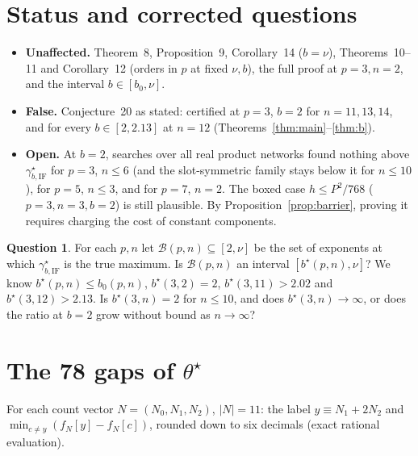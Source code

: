 \documentclass[11pt]{article}
\theoremstyle{definition}
\newtheorem{question}[theorem]{Question}
\newcommand{\gIF}{\gamma^{\star}_{b,\mathrm{IF}}}
\begin{document}
\section{Status and corrected questions}

\begin{itemize}
\item \textbf{Unaffected.} Theorem~8, Proposition~9, Corollary~14 ($b=\nu$), Theorems~10--11 and Corollary~12
(orders in $p$ at fixed $\nu,b$), the full proof at $p=3,n=2$, and the interval $b\in[b_0,\nu]$.
\item \textbf{False.} Conjecture~20 as stated: certified at $p=3$, $b=2$ for $n=11,13,14$, and for every $b\in[2,2.13]$ at $n=12$ (Theorems~\ref{thm:main}--\ref{thm:b}).
\item \textbf{Open.} At $b=2$, searches over all real product networks found nothing above $\gIF$ for $p=3$,
$n\le 6$ (and the slot-symmetric family stays below it for $n\le10$), for $p=5$, $n\le3$, and for $p=7$,
$n=2$. The boxed case $h\le P^2/768$ ($p=3,n=3,b=2$) is still plausible. By Proposition~\ref{prop:barrier},
proving it requires charging the cost of constant components.
\end{itemize}

\begin{question}
For each $p,n$ let $\mathcal B(p,n)\subseteq[2,\nu]$ be the set of exponents at which $\gIF$ is the true maximum.
Is $\mathcal B(p,n)$ an interval $[b^\star(p,n),\nu]$? We know $b^\star(p,n)\le b_0(p,n)$,
$b^\star(3,2)=2$, $b^\star(3,11)>2.02$ and $b^\star(3,12)>2.13$. Is $b^\star(3,n)=2$ for $n\le10$, and does
$b^\star(3,n)\to\infty$, or does the ratio at $b=2$ grow without bound as $n\to\infty$?
\end{question}

\appendix
\section{The 78 gaps of $\theta^\star$}\label{app:gaps}

For each count vector $N=(N_0,N_1,N_2)$, $|N|=11$: the label $y\equiv N_1+2N_2$ and
$\min_{c\ne y}(f_N[y]-f_N[c])$, rounded down to six decimals (exact rational evaluation).
\end{document}
